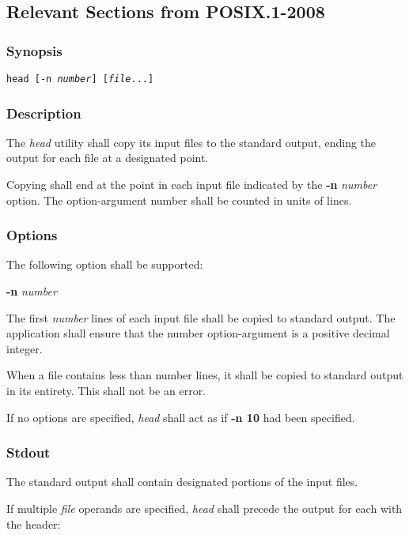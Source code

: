 \documentclass[en, listings]{labreport}
\begin{document}
\subsection*{Relevant Sections from POSIX.1-2008}

\subsubsection*{Synopsis}

\noindent
\texttt{head [-n \textit{number}] [\textit{file}...]}

\subsubsection*{Description}

\noindent
The \textit{head} utility shall copy its input files to the standard output,
ending the output for each file at a designated point.

\noindent
Copying shall end at the point in each input file indicated by the
\textbf{-n} \textit{number} option. The option-argument number shall be counted in units of lines.

\subsubsection*{Options}

\noindent
The following option shall be supported:

\textbf{-n} \textit{number}

The first \textit{number} lines of each input file shall be copied to standard output.
The application shall ensure that the number option-argument is a positive decimal integer.

\noindent
When a file contains less than number lines, it shall be copied to standard output
in its entirety. This shall not be an error.

\noindent
If no options are specified, \textit{head} shall act as if \textbf{-n 10} had been specified.

\subsubsection*{Stdout}

\noindent
The standard output shall contain designated portions of the input files.

\noindent
If multiple \textit{file} operands are specified, \textit{head} shall precede
the output for each with the header:
\end{document}
